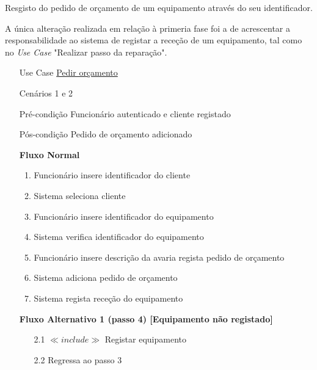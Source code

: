\documentclass[../relatorio.tex]{subfiles}
\begin{document}
Resgisto do pedido de orçamento de um equipamento através do seu identificador.

A única alteração realizada em relação à primeria fase foi a de acrescentar a responsabilidade ao sistema de registar a receção de 
um equipamento, tal como no \textit{Use Case} "Realizar passo da reparação".
\begin{itemize}
	\item[Use Case] {\underline{Pedir orçamento}}
	\item[Cenários] {1 e 2}
	\item[Pré-condição] {Funcionário autenticado e cliente registado}
	\item[Pós-condição] {Pedido de orçamento adicionado}
	      \begin{flushleft}
		      \textbf{Fluxo Normal}
	      \end{flushleft}
	      \begin{enumerate}
		      \item Funcionário insere identificador do cliente
              \item Sistema seleciona cliente
		      \item Funcionário insere identificador do equipamento
		      \item Sistema verifica identificador do equipamento
		      \item Funcionário insere descrição da avaria regista pedido de orçamento
		      \item Sistema adiciona pedido de orçamento
		      \item Sistema regista receção do equipamento
	      \end{enumerate}

	      \begin{flushleft}
		      \textbf{Fluxo Alternativo 1 (passo 4) [Equipamento não registado]}
	      \end{flushleft}
	      \begin{itemize}
		      \item[2.1] $\ll include \gg$ Registar equipamento
		      \item[2.2] Regressa ao passo 3
	      \end{itemize}
\end{itemize}
\end{document}

